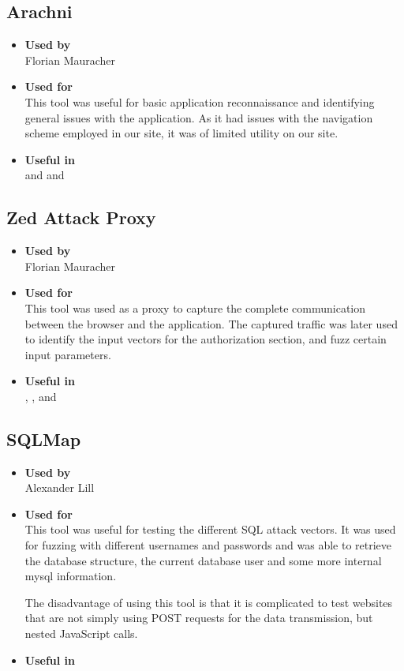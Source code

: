 \subsection*{Arachni}
\begin{itemize}
	\item \textbf{Used by}\\ Florian Mauracher
	\item \textbf{Used for}\\ This tool was useful for basic application reconnaissance and identifying general issues with the application.
		As it had issues with the navigation scheme employed in our site, it was of limited utility on our site.
	\item \textbf{Useful in}\\  and  and 
\end{itemize}

\subsection*{Zed Attack Proxy}
\begin{itemize}
	\item \textbf{Used by}\\ Florian Mauracher
	\item \textbf{Used for}\\ This tool was used as a proxy to capture the complete communication between the browser and the application.
		The captured traffic was later used to identify the input vectors for the authorization section, and fuzz certain input parameters.
	\item \textbf{Useful in}\\ , ,  and 
\end{itemize}

\subsection*{SQLMap}
\begin{itemize}
	\item \textbf{Used by}\\ Alexander Lill
	\item \textbf{Used for}\\ This tool was useful for testing the different SQL attack vectors. It was used for fuzzing with different usernames and passwords and was able to retrieve the database structure, the current database user and some more internal mysql information.
	
	The disadvantage of using this tool is that it is complicated to test websites that are not simply using POST requests for the data transmission, but nested JavaScript calls.
	\item \textbf{Useful in}\\ 
\end{itemize}

